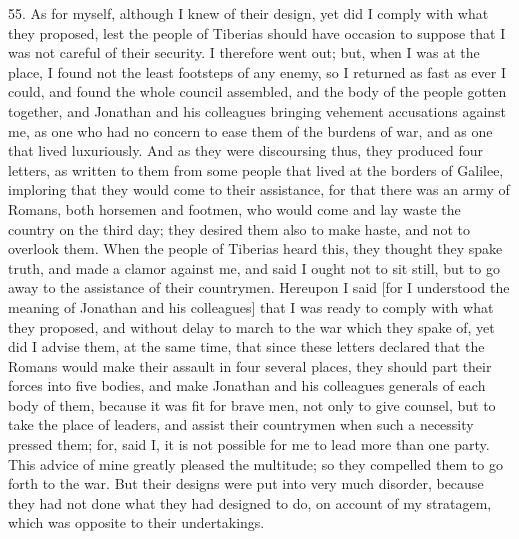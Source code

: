 55. As for myself, although I knew of their design, yet did I comply with
what they proposed, lest the people of Tiberias should have occasion to
suppose that I was not careful of their security. I therefore went out;
but, when I was at the place, I found not the least footsteps of any
enemy, so I returned as fast as ever I could, and found the whole council
assembled, and the body of the people gotten together, and Jonathan and
his colleagues bringing vehement accusations against me, as one who had no
concern to ease them of the burdens of war, and as one that lived
luxuriously. And as they were discoursing thus, they produced four
letters, as written to them from some people that lived at the borders of
Galilee, imploring that they would come to their assistance, for that
there was an army of Romans, both horsemen and footmen, who would come and
lay waste the country on the third day; they desired them also to make
haste, and not to overlook them. When the people of Tiberias heard this,
they thought they spake truth, and made a clamor against me, and said I
ought not to sit still, but to go away to the assistance of their
countrymen. Hereupon I said [for I understood the meaning of Jonathan and
his colleagues] that I was ready to comply with what they proposed, and
without delay to march to the war which they spake of, yet did I advise
them, at the same time, that since these letters declared that the Romans
would make their assault in four several places, they should part their
forces into five bodies, and make Jonathan and his colleagues generals of
each body of them, because it was fit for brave men, not only to give
counsel, but to take the place of leaders, and assist their countrymen
when such a necessity pressed them; for, said I, it is not possible for me
to lead more than one party. This advice of mine greatly pleased the
multitude; so they compelled them to go forth to the war. But their
designs were put into very much disorder, because they had not done what
they had designed to do, on account of my stratagem, which was opposite to
their undertakings.

